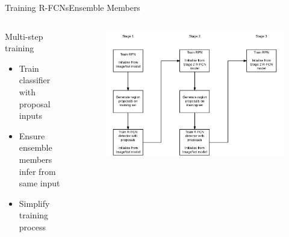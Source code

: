 \begin{frame}{Training R-FCNs}{Ensemble Members}
\begin{columns}
        \begin{block}{Multi-step training}
        \begin{itemize}
            \item Train classifier with proposal inputs
            \item Ensure ensemble members infer from same input
            \item Simplify training process
        \end{itemize}
    \end{block}
        \begin{figure}
            \includegraphics[width=1.0 \textwidth]{figs/4step-crop.pdf}
        \end{figure}
    \end{columns}
\end{frame}
